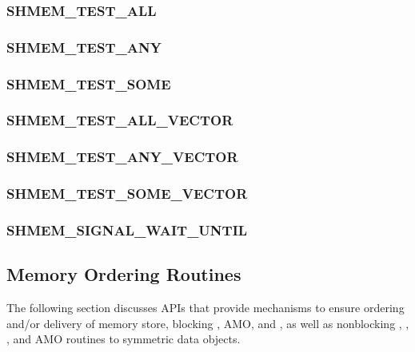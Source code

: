 \documentclass[10pt]{book}
\begin{document}
\subsubsection{\textbf{SHMEM\_TEST\_ALL}}\label{subsec:shmem_test_all}


\subsubsection{\textbf{SHMEM\_TEST\_ANY}}\label{subsec:shmem_test_any}


\subsubsection{\textbf{SHMEM\_TEST\_SOME}}\label{subsec:shmem_test_some}


\subsubsection{\textbf{SHMEM\_TEST\_ALL\_VECTOR}}\label{subsec:shmem_test_all_vector}


\subsubsection{\textbf{SHMEM\_TEST\_ANY\_VECTOR}}\label{subsec:shmem_test_any_vector}


\subsubsection{\textbf{SHMEM\_TEST\_SOME\_VECTOR}}\label{subsec:shmem_test_some_vector}


\subsubsection{\textbf{SHMEM\_SIGNAL\_WAIT\_UNTIL}}\label{subsec:shmem_signal_wait_until}




\subsection{Memory Ordering Routines}\label{subsec:memory_order}
The following section discusses \openshmem \acp{API} that provide mechanisms to
ensure ordering and/or delivery of memory store, blocking , \ac{AMO},
and , as well as nonblocking \PUT{},
, \GET{}, and \ac{AMO} routines to symmetric data
objects.
\end{document}
